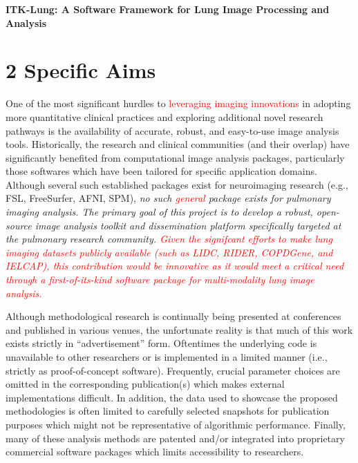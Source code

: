 \documentclass[11pt,]{article}
\title{}
\author{}
\date{}
\begin{document}
\maketitle


\begin{center}
{\Large \bf ITK-Lung:  A Software Framework for Lung Image Processing and Analysis}
\end{center}

\section{2 Specific Aims}\label{specific-aims}

One of the most significant hurdles to
\textcolor{red}{leveraging imaging innovations} in adopting more
quantitative clinical practices and exploring additional novel research
pathways is the availability of accurate, robust, and easy-to-use image
analysis tools. Historically, the research and clinical communities (and
their overlap) have significantly benefited from computational image
analysis packages, particularly those softwares which have been tailored
for specific application domains. Although several such established
packages exist for neuroimaging research (e.g., FSL, FreeSurfer, AFNI,
SPM), \emph{no such \textcolor{red}{general} package exists for
pulmonary imaging analysis. The primary goal of this project is to
develop a robust, open-source image analysis toolkit and dissemination
platform specifically targeted at the pulmonary research community.
\textcolor{red}{Given the signifcant efforts
to make lung imaging datasets publicly available (such as LIDC, RIDER, COPDGene,
and IELCAP), this contribution would be innovative as it would meet a critical
need through a first-of-its-kind software package for multi-modality lung image analysis.}}

Although methodological research is continually being presented at
conferences and published in various venues, the unfortunate reality is
that much of this work exists strictly in ``advertisement'' form.
Oftentimes the underlying code is unavailable to other researchers or is
implemented in a limited manner (i.e., strictly as proof-of-concept
software). Frequently, crucial parameter choices are omitted in the
corresponding publication(s) which makes external implementations
difficult. In addition, the data used to showcase the proposed
methodologies is often limited to carefully selected snapshots for
publication purposes which might not be representative of algorithmic
performance. Finally, many of these analysis methods are patented and/or
integrated into proprietary commercial software packages which limits
accessibility to researchers.
\end{document}
